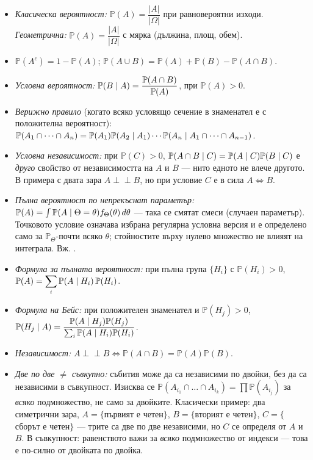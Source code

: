 \begin{itemize}\itemsep2pt
  \item \emph{Класическа вероятност:} $\mathbb{P}(A) = \dfrac{|A|}{|\Omega|}$ при равновероятни изходи.
        \emph{Геометрична:} $\mathbb{P}(A) = \dfrac{|A|}{|\Omega|}$ с мярка (дължина, площ, обем).
  \item $\mathbb{P}(A^c) = 1 - \mathbb{P}(A)$;\quad
        $\mathbb{P}(A \cup B) = \mathbb{P}(A) + \mathbb{P}(B) - \mathbb{P}(A \cap B)$.
  \item \emph{Условна вероятност:} $\mathbb{P}(B \mid A) = \dfrac{\mathbb{P}(A \cap B)}{\mathbb{P}(A)}$, при $\mathbb{P}(A) > 0$.
  \item \emph{Верижно правило} (когато всяко условящо сечение в знаменател е с
        положителна вероятност):
        $\mathbb{P}(A_1 \cap \dots \cap A_n) = \mathbb{P}(A_1)\mathbb{P}(A_2 \mid A_1)\cdots
         \mathbb{P}(A_n \mid A_1 \cap \dots \cap A_{n-1})$.
  \item \emph{Условна независимост:} при $\mathbb P(C)>0$,
        $\mathbb{P}(A \cap B \mid C) = \mathbb{P}(A \mid C)\mathbb{P}(B \mid C)$
        е \emph{друго} свойство от независимостта на $A$ и $B$ — нито едното не влече другото.
        В примера с двата зара $A \perp\!\!\!\perp B$, но при условие $C$ е в сила $A \iff B$.
  \item \emph{Пълна вероятност по непрекъснат параметър:}
        $\mathbb{P}(A) = \int \mathbb{P}(A \mid \Theta = \theta) f_\Theta(\theta)\,d\theta$ —
        така се смятат смеси (случаен параметър). Точковото условие означава избрана
        регулярна условна версия и е определено само за $\mathbb P_\Theta$-почти всяко
        $\theta$; стойностите върху нулево множество не влияят на интеграла. Вж.
        .
  \item \emph{Формула за пълната вероятност:} при пълна група $\{H_i\}$ с $\mathbb{P}(H_i)>0$,
        $\displaystyle \mathbb{P}(A) = \sum_i \mathbb{P}(A \mid H_i)\,\mathbb{P}(H_i)$.
  \item \emph{Формула на Бейс:} при положителен знаменател и $\mathbb P(H_j)>0$,
        $\displaystyle \mathbb{P}(H_j \mid A) = \frac{\mathbb{P}(A \mid H_j)\mathbb{P}(H_j)}{\sum_i \mathbb{P}(A \mid H_i)\mathbb{P}(H_i)}$.
  \item \emph{Независимост:} $A \perp\!\!\!\perp B \iff \mathbb{P}(A \cap B) = \mathbb{P}(A)\mathbb{P}(B)$.
  \item \emph{Две по две $\ne$ съвкупно:} събития може да са независими по двойки, без да са
        независими в съвкупност. Изисква се $\mathbb{P}(A_{i_1}\cap\dots\cap A_{i_k}) =
        \prod \mathbb{P}(A_{i_j})$ за \emph{всяко} подмножество, не само за двойките.
        Класически пример: два симетрични зара, $A=\{$първият е четен$\}$,
        $B=\{$вторият е четен$\}$, $C=\{$сборът е четен$\}$ — трите са две по две независими,
        но $C$ се определя от $A$ и $B$.
        В съвкупност: равенството важи за \emph{всяко} подмножество от индекси — това е
        по-силно от двойката по двойка.
\end{itemize}


